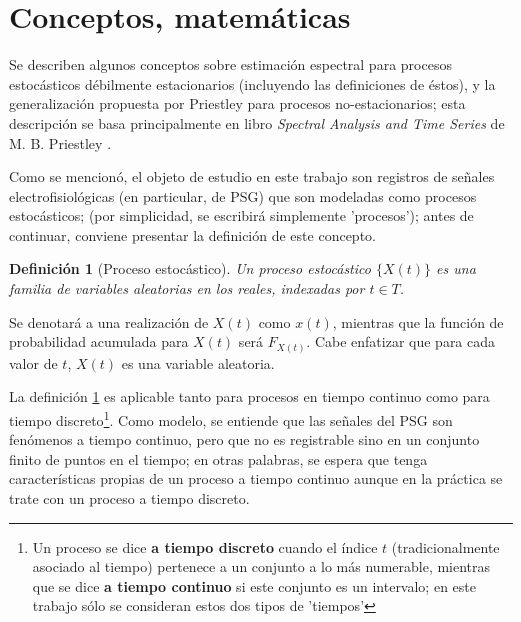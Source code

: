\documentclass[12pt,a4paper]{mitthesis}
\newtheorem{defn}{Definici\'on}
\begin{document}

\section{Conceptos, matem\'aticas}

Se describen algunos conceptos sobre estimaci\'on espectral para procesos estoc\'asticos 
d\'ebilmente estacionarios (incluyendo las definiciones de \'estos), y la generalizaci\'on 
propuesta por Priestley para procesos no-estacionarios; esta descripci\'on se basa principalmente 
en libro \textit{Spectral Analysis and Time Series} de M. B. Priestley \cite{Priestley81}.

Como se mencion\'o, el objeto de estudio en este trabajo son registros de se\~nales
electrofisiol\'ogicas (en particular, de PSG) que son modeladas como procesos estoc\'asticos; (por 
simplicidad, se escribir\'a simplemente 'procesos'); antes de continuar, conviene presentar la 
definici\'on de este concepto. 

\begin{defn}[Proceso estoc\'astico]
Un proceso estoc\'astico $\{ X(t) \}$ es una familia de variables aleatorias en los reales, 
indexadas por $t \in T$.
\label{proc_estocastico}
\end{defn}

Se denotar\'a a una realizaci\'on de $X(t)$ como $x(t)$, mientras que la funci\'on de probabilidad 
acumulada para $X(t)$ ser\'a $F_{X(t)}$. Cabe enfatizar que para cada valor de $t$, $X(t)$ es una 
variable  aleatoria.

La definici\'on \ref{proc_estocastico} es aplicable tanto para procesos en tiempo continuo como 
para tiempo discreto\footnote{Un proceso se dice \textbf{a tiempo discreto} cuando el \'indice $t$ 
(tradicionalmente asociado al tiempo) pertenece a un conjunto a lo m\'as numerable, mientras que se 
dice \textbf{a tiempo continuo} si este conjunto es un intervalo; en este trabajo s\'olo se 
consideran estos dos tipos de 'tiempos'}.
Como modelo, se entiende que las se\~nales del PSG son fen\'omenos a tiempo continuo, pero que no
es registrable sino en un conjunto finito de puntos en el tiempo; en otras palabras, se espera que 
tenga caracter\'isticas propias de un proceso a tiempo continuo aunque en la pr\'actica se trate 
con un proceso a tiempo discreto.
\end{document}
